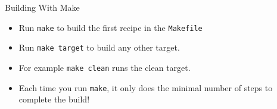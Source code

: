 \documentclass[]{beamer}
\begin{document}
\begin{frame}{Building With Make}
    \begin{itemize}[<+->]
        \item Run \texttt{make} to build the first recipe in the
            \texttt{Makefile}
        \item Run \texttt{make target} to build any other target.
        \item For example \texttt{make clean} runs the clean target.
        \item Each time you run \texttt{make}, it only does the
            minimal number of steps to complete the build!
    \end{itemize}
\end{frame}
\end{document}
